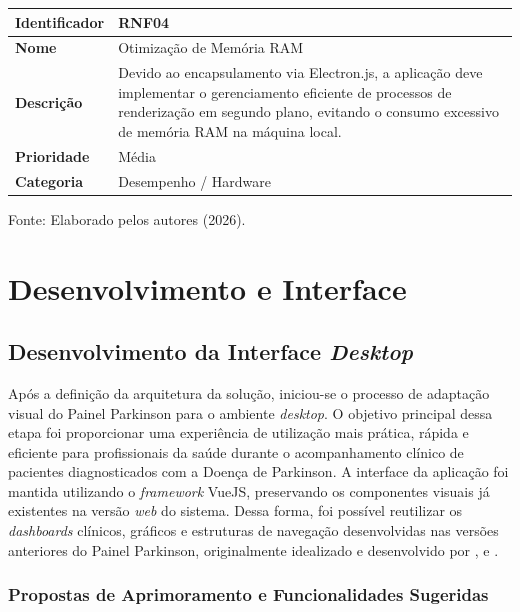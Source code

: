 \begin{quadro}[H]
\centering
\caption{Especificação do Requisito Não Funcional 04 (RNF04) - Consumo de Recursos}
\label{quadro:rnf04}
\begin{tabular}{|l|p{11cm}|}
\hline
\textbf{Identificador} & \textbf{RNF04} \\ \hline
\textbf{Nome} & Otimização de Memória RAM \\ \hline
\textbf{Descrição} & Devido ao encapsulamento via Electron.js, a aplicação deve implementar o gerenciamento eficiente de processos de renderização em segundo plano, evitando o consumo excessivo de memória RAM na máquina local. \\ \hline
\textbf{Prioridade} & Média \\ \hline
\textbf{Categoria} & Desempenho / Hardware \\ \hline
\end{tabular}
\centerline{\footnotesize Fonte: Elaborado pelos autores (2026).}
\end{quadro}


\section{Desenvolvimento e Interface}

\subsection{Desenvolvimento da Interface \textit{Desktop}}

Após a definição da arquitetura da solução, iniciou-se o processo de adaptação visual do Painel Parkinson para o ambiente \textit{desktop}. O objetivo principal dessa etapa foi proporcionar uma experiência de utilização mais prática, rápida e eficiente para profissionais da saúde durante o acompanhamento clínico de pacientes diagnosticados com a Doença de Parkinson.
A interface da aplicação foi mantida utilizando o \textit{framework} VueJS, preservando os componentes visuais já existentes na versão \textit{web} do sistema. Dessa forma, foi possível reutilizar os \textit{dashboards} clínicos, gráficos e estruturas de navegação desenvolvidas nas versões anteriores do Painel Parkinson, originalmente idealizado e desenvolvido por \cite{oliveira2021}, \cite{costa2022sistema} e \cite{oliveira2023}.

\subsubsection{Propostas de Aprimoramento e Funcionalidades Sugeridas}
\label{subsubsec:propostas_aprimoramento_sugeridas}


